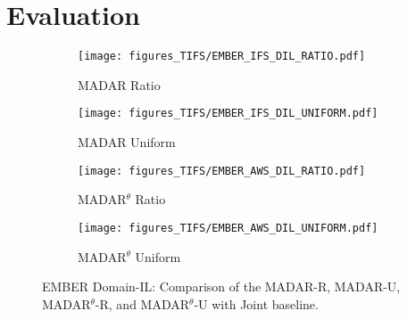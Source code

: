 \section{Evaluation}







\begin{figure}[!t]
    \centering
    \begin{subfigure}{0.485\linewidth}
        \centering
        \texttt{[image: figures\_TIFS/EMBER\_IFS\_DIL\_RATIO.pdf]}
        \label{fig:EMBER_DIL_IFS_R}
        \vspace{-0.4cm}
        \caption{MADAR Ratio}
    \end{subfigure}
    \hfill
    \begin{subfigure}{0.485\linewidth}
        \centering
        \texttt{[image: figures\_TIFS/EMBER\_IFS\_DIL\_UNIFORM.pdf]}
        \label{fig:EMBER_DIL_IFS_U}
        \vspace{-0.4cm}
        \caption{MADAR Uniform}
    \end{subfigure}
    \vfill
    \begin{subfigure}{0.485\linewidth}
        \centering
        \texttt{[image: figures\_TIFS/EMBER\_AWS\_DIL\_RATIO.pdf]}
        \label{fig:EMBER_DIL_AWS_R}
        \vspace{-0.4cm}
        \caption{MADAR$^\theta$ Ratio}
    \end{subfigure}
    \hfill
    \begin{subfigure}{0.485\linewidth}
        \centering
        \texttt{[image: figures\_TIFS/EMBER\_AWS\_DIL\_UNIFORM.pdf]}
        \label{fig:EMBER_DIL_AWS_U}
        \vspace{-0.4cm}
        \caption{MADAR$^\theta$ Uniform}
    \end{subfigure}

    \caption{EMBER Domain-IL: Comparison of the MADAR-R, MADAR-U, MADAR$^\theta$-R, and MADAR$^\theta$-U with Joint baseline.}
    \label{fig:ember_DIL}
    \vspace{-0.3cm}
\end{figure}







